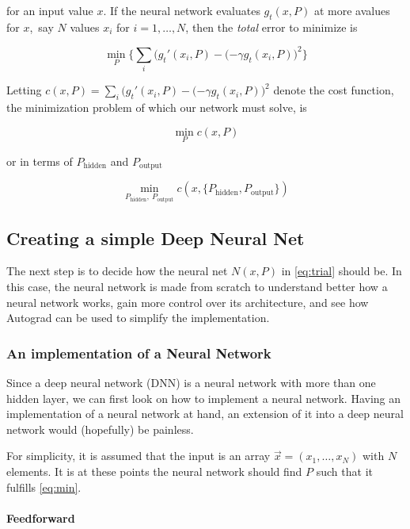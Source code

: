 \documentclass[11pt]{article}
\begin{document}
for an input value \(x\). If the neural network evaluates \(g_t(x, P)\)
at more avalues for \(x\),~say \(N\) values \(x_i\) for
\(i = 1, \dots, N\), then the \emph{total} error to minimize is

\[ \label{eq:min}
\min_{P}\Big\{\sum_i  \big(g_t'(x_i, P) - ( -\gamma g_t(x_i, P) \big)^2 \Big\} 
\]

Letting
\(c(x, P) = \sum_i \big(g_t'(x_i, P) - ( -\gamma g_t(x_i, P) \big)^2\)
denote the cost function, the minimization problem of which our network
must solve, is

\[
\min_{P} c(x, P)
\]

or in terms of \(P_{\text{hidden} }\) and \(P_{\text{output} }\)

\[
\min_{P_{\text{hidden} }, \ P_{\text{output} }} c(x, \{P_{\text{hidden} }, P_{\text{output} }\})
\]

\hypertarget{creating-a-simple-deep-neural-net}{%
\subsection{Creating a simple Deep Neural
Net}\label{creating-a-simple-deep-neural-net}}

The next step is to decide how the neural net \(N(x, P)\) in
\eqref{eq:trial} should be. In this case, the neural network is made
from scratch to understand better how a neural network works, gain more
control over its architecture, and see how Autograd can be used to
simplify the implementation.

\hypertarget{an-implementation-of-a-neural-network}{%
\subsubsection{An implementation of a Neural
Network}\label{an-implementation-of-a-neural-network}}

Since a deep neural network (DNN) is a neural network with more than one
hidden layer, we can first look on how to implement a neural network.
Having an implementation of a neural network at hand, an extension of it
into a deep neural network would (hopefully) be painless.

For simplicity, it is assumed that the input is an array
\(\vec x = (x_1, \dots, x_N)\) with \(N\) elements. It is at these
points the neural network should find \(P\) such that it fulfills
\eqref{eq:min}.

\hypertarget{feedforward}{%
\paragraph{Feedforward}\label{feedforward}}
\end{document}
